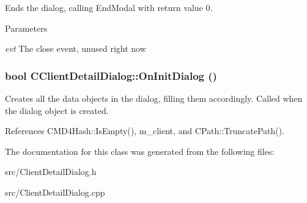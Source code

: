 Ends the dialog, calling EndModal with return value 0. 
\begin{DoxyParams}{Parameters}
\item[{\em evt}]The close event, unused right now \end{DoxyParams}
\subsubsection[{OnInitDialog}]{\setlength{\rightskip}{0pt plus 5cm}bool CClientDetailDialog::OnInitDialog ()\hspace{0.3cm}{\ttfamily  [protected, virtual]}}\label{classCClientDetailDialog_a5b8dc4fedf94b3543ce8792acb80bdbc}


Creates all the data objects in the dialog, filling them accordingly. Called when the dialog object is created. 

References CMD4Hash::IsEmpty(), m\_\-client, and CPath::TruncatePath().

The documentation for this class was generated from the following files:\begin{DoxyCompactItemize}
\item 
src/ClientDetailDialog.h\item 
src/ClientDetailDialog.cpp\end{DoxyCompactItemize}

